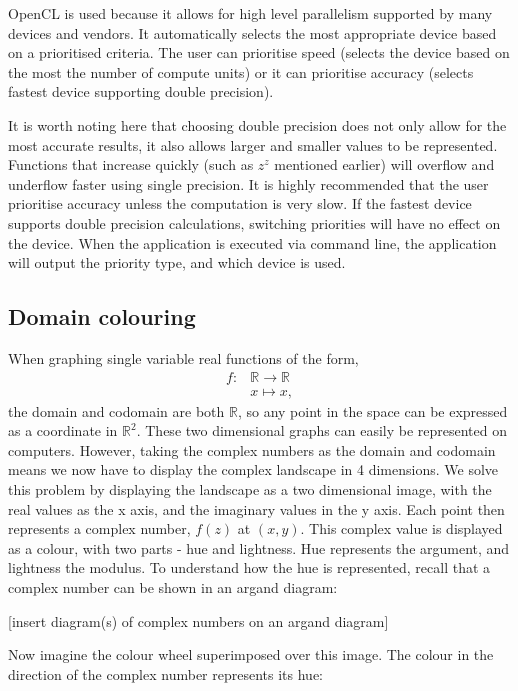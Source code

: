 \documentclass{article}
\newcommand{\R}{\ensuremath{\mathbb{R}}}
\begin{document}
	OpenCL is used because it allows for high level parallelism supported by many devices and vendors. It automatically selects the most appropriate device based on a prioritised criteria. The user can prioritise speed (selects the device based on the most the number of compute units) or it can prioritise accuracy (selects fastest device supporting double precision). 
	
	It is worth noting here that choosing double precision does not only allow for the most accurate results, it also allows larger and smaller values to be represented. Functions that increase quickly (such as $z^z$ mentioned earlier) will overflow and underflow faster using single precision. It is highly recommended that the user prioritise accuracy unless the computation is very slow. If the fastest device supports double precision calculations, switching priorities will have no effect on the device. When the application is executed via command line, the application will output the priority type, and which device is used.
	
	\subsection{Domain colouring}
		When graphing single variable real functions of the form, \begin{align*}
			f : &\R \to \R\\
			 &x \mapsto x,
		\end{align*} the domain and codomain are both $\R$, so any point in the space can be expressed as a coordinate in $\R^2$. These two dimensional graphs can 
		easily be represented on computers. However, taking the complex numbers as the domain and codomain means we now have to display the complex landscape
		in 4 dimensions. We solve this problem by displaying the landscape as a two dimensional image, with the real values as the x axis, and the imaginary values in 
		the y axis. Each point then represents a complex number, $f(z)$ at $(x,y)$. This complex value is displayed as a colour, with two parts - hue and lightness. Hue 
		represents the argument, and lightness the modulus. To understand how the hue is represented, recall that a complex number can be shown in an argand diagram:
		
		[insert diagram(s) of complex numbers on an argand diagram]
		
		Now imagine the colour wheel superimposed over this image. The colour in the direction of the complex number represents its hue:
		
\end{document}
